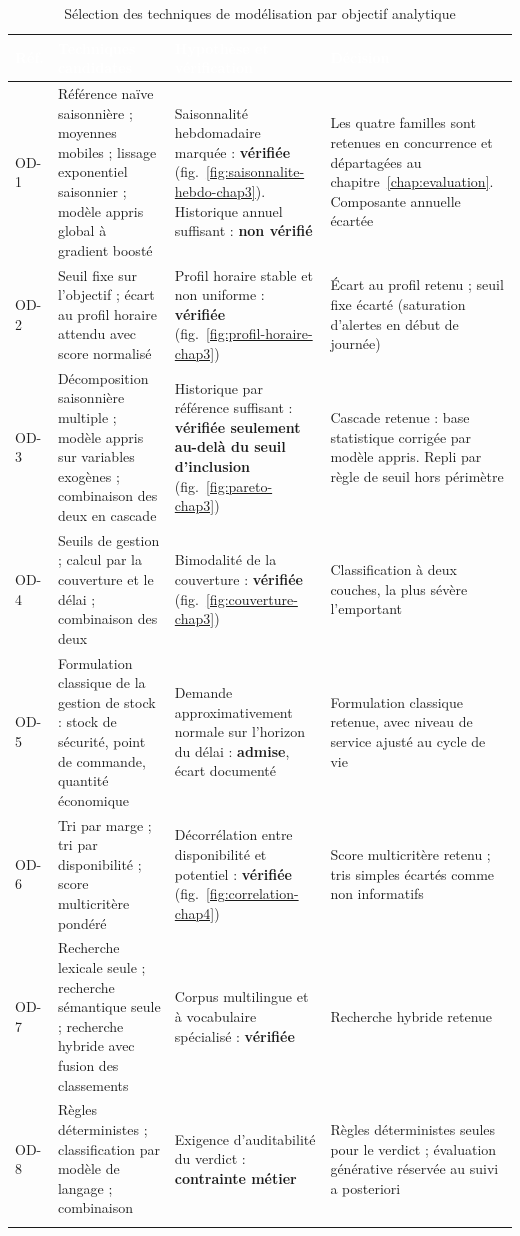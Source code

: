 \begin{longtable}{|P{1.1cm}|P{3.6cm}|P{4.4cm}|P{4.0cm}|}
\hline
{}
\textcolor{white}{\textbf{Réf.}} &
\textcolor{white}{\textbf{Techniques candidates}} &
\textcolor{white}{\textbf{Hypothèse et vérification}} &
\textcolor{white}{\textbf{Décision}} \\
\hline
\endhead
\hline
\endfoot
\hline
\endlastfoot
OD-1 & Référence naïve saisonnière ; moyennes mobiles ; lissage exponentiel saisonnier ; modèle appris global à gradient boosté & Saisonnalité hebdomadaire marquée : \textbf{vérifiée} (fig.~\ref{fig:saisonnalite-hebdo-chap3}). Historique annuel suffisant : \textbf{non vérifié} & Les quatre familles sont retenues en concurrence et départagées au chapitre~\ref{chap:evaluation}. Composante annuelle écartée \\
\hline
OD-2 & Seuil fixe sur l'objectif ; écart au profil horaire attendu avec score normalisé & Profil horaire stable et non uniforme : \textbf{vérifiée} (fig.~\ref{fig:profil-horaire-chap3}) & Écart au profil retenu ; seuil fixe écarté (saturation d'alertes en début de journée) \\
\hline
OD-3 & Décomposition saisonnière multiple ; modèle appris sur variables exogènes ; combinaison des deux en cascade & Historique par référence suffisant : \textbf{vérifiée seulement au-delà du seuil d'inclusion} (fig.~\ref{fig:pareto-chap3}) & Cascade retenue : base statistique corrigée par modèle appris. Repli par règle de seuil hors périmètre \\
\hline
OD-4 & Seuils de gestion ; calcul par la couverture et le délai ; combinaison des deux & Bimodalité de la couverture : \textbf{vérifiée} (fig.~\ref{fig:couverture-chap3}) & Classification à deux couches, la plus sévère l'emportant \\
\hline
OD-5 & Formulation classique de la gestion de stock : stock de sécurité, point de commande, quantité économique & Demande approximativement normale sur l'horizon du délai : \textbf{admise}, écart documenté & Formulation classique retenue, avec niveau de service ajusté au cycle de vie \\
\hline
OD-6 & Tri par marge ; tri par disponibilité ; score multicritère pondéré & Décorrélation entre disponibilité et potentiel : \textbf{vérifiée} (fig.~\ref{fig:correlation-chap4}) & Score multicritère retenu ; tris simples écartés comme non informatifs \\
\hline
OD-7 & Recherche lexicale seule ; recherche sémantique seule ; recherche hybride avec fusion des classements & Corpus multilingue et à vocabulaire spécialisé : \textbf{vérifiée} & Recherche hybride retenue \\
\hline
OD-8 & Règles déterministes ; classification par modèle de langage ; combinaison & Exigence d'auditabilité du verdict : \textbf{contrainte métier} & Règles déterministes seules pour le verdict ; évaluation générative réservée au suivi a posteriori \\
\hline
\caption{Sélection des techniques de modélisation par objectif analytique}
\label{tab:techniques-chap4}
\end{longtable}
\endgroup

